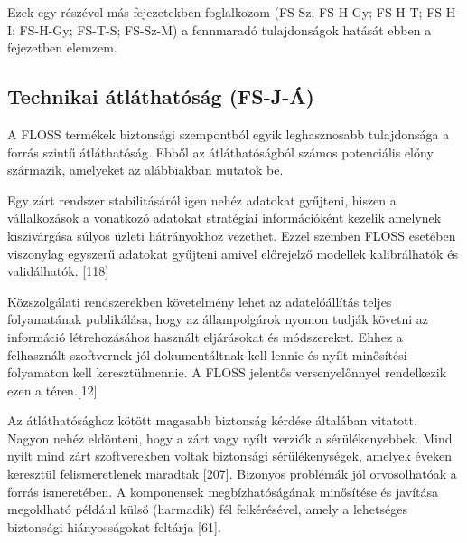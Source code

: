 \documentclass[12pt,magyar,a4paper,oneside]{scrreprt}
\begin{document}
Ezek egy részével más fejezetekben foglalkozom (FS-Sz; FS-H-Gy; FS-H-T;
FS-H-I; FS-H-Gy; FS-T-S; FS-Sz-M) a fennmaradó tulajdonságok hatását
ebben a fejezetben elemzem.

\hypertarget{sec:FS-J-uxc1}{%
\subsection{Technikai átláthatóság (FS-J-Á)}\label{sec:FS-J-uxc1}}

A FLOSS termékek biztonsági szempontból egyik leghasznosabb tulajdonsága
a forrás szintű átláthatóság. Ebből az átláthatóságból számos
potenciális előny származik, amelyeket az alábbiakban mutatok be.

Egy zárt rendszer stabilitásáról igen nehéz adatokat gyűjteni, hiszen a
vállalkozások a vonatkozó adatokat stratégiai információként kezelik
amelynek kiszivárgása súlyos üzleti hátrányokhoz vezethet. Ezzel szemben
FLOSS esetében viszonylag egyszerű adatokat gyűjteni amivel előrejelző
modellek kalibrálhatók és validálhatók. {[}118{]}

Közszolgálati rendszerekben követelmény lehet az adatelőállítás teljes
folyamatának publikálása, hogy az állampolgárok nyomon tudják követni az
információ létrehozásához használt eljárásokat és módszereket. Ehhez a
felhasznált szoftvernek jól dokumentáltnak kell lennie és nyílt
minősítési folyamaton kell keresztülmennie. A FLOSS jelentős
versenyelőnnyel rendelkezik ezen a téren.{[}12{]}

Az átláthatósághoz kötött magasabb biztonság kérdése általában vitatott.
Nagyon nehéz eldönteni, hogy a zárt vagy nyílt verziók a
sérülékenyebbek. Mind nyílt mind zárt szoftverekben voltak biztonsági
sérülékenységek, amelyek éveken keresztül felismeretlenek maradtak
{[}207{]}. Bizonyos problémák jól orvosolhatóak a forrás ismeretében. A
komponensek megbízhatóságának minősítése és javítása megoldható például
külső (harmadik) fél felkérésével, amely a lehetséges biztonsági
hiányosságokat feltárja {[}61{]}.
\end{document}
